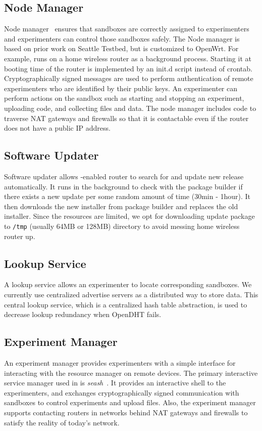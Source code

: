 \subsection{Node Manager}
\label{sec.nodemanager}
Node manager~\cite{nodemanager} ensures that sandboxes are correctly assigned to experimenters and experimenters can control those sandboxes safely. The Node manager is based on prior work on Seattle Testbed, but is customized to OpenWrt. For example, \sysname runs on a home wireless router as a background process. Starting it at booting time of the router is implemented by an init.d script instead of crontab. Cryptographically signed messages are used to perform authentication of remote experimenters who are identified by their public keys. An experimenter can perform actions on the sandbox such as starting and stopping an experiment, uploading code, and collecting files and data. The node manager includes code to traverse NAT gateways and firewalls so that it is contactable even if the router does not have a public IP address. 

\subsection{Software Updater}
\label{sec.softwareupdater}
Software updater allows \sysname-enabled router to search for and update new release automatically. It runs in the background to check with the package builder if there exists a new update per some random amount of time (30min - 1hour). It then downloads the new installer from package builder and replaces the old installer. Since the resources are limited, we opt for downloading update package to \texttt{/tmp} (usually 64MB or 128MB) directory to avoid messing home wireless router up.   

\subsection{Lookup Service}
\label{sec.lookupservice}
A lookup service allows an experimenter to locate corresponding sandboxes. We currently use centralized advertise servers as a distributed way to store data. This central lookup service, which is a centralized hash table abstraction, is used to decrease lookup redundancy when OpenDHT fails.

\subsection{Experiment Manager}
\label{sec.seash}
An experiment manager provides experimenters with a simple interface for interacting with the resource manager on remote devices. The primary interactive service manager used in \sysname is \textit{seash}~\cite{seash}. It provides an interactive shell to the experimenters, and exchanges cryptographically signed communication with sandboxes to control experiments and upload files. Also, the experiment manager supports contacting routers in networks behind NAT gateways and firewalls to satisfy the reality of today's network.

